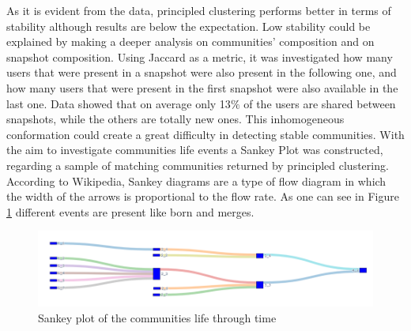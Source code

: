 \documentclass[sigchi]{acmart}
\begin{document}
\begin{table}[h]
    \centering
        \caption{Results and performance of Leiden and Principled Clustering (PC) on the four different snapshots}

    \label{tab:cddin}
\end{table}

As it is evident from the data, principled clustering performs better in terms of stability although results are below the expectation. Low stability could be explained by making a deeper analysis on communities’ composition and on snapshot composition. Using Jaccard as a metric, it was investigated how many users that were present in a snapshot were also present in the following one, and how many users that were present in the first snapshot were also available in the last one. Data showed that on average only 13$\%$ of the users are shared between snapshots, while the others are totally new ones. This inhomogeneous conformation could create a great difficulty in detecting stable communities. With the aim to investigate communities life events a Sankey Plot was constructed, regarding a sample of matching communities returned by principled clustering. According to Wikipedia, Sankey diagrams are a type of flow diagram in which the width of the arrows is proportional to the flow rate\cite{sankey}. As one can see in Figure \ref{fig:alluvial} different events are present like born and merges.

\begin{figure}[h]
    \centering
    \includegraphics[width=\columnwidth]{report/img/alluvial_cd.png}
    \caption{Sankey plot of the communities life through time}
    \label{fig:alluvial}
\end{figure}
\end{document}
